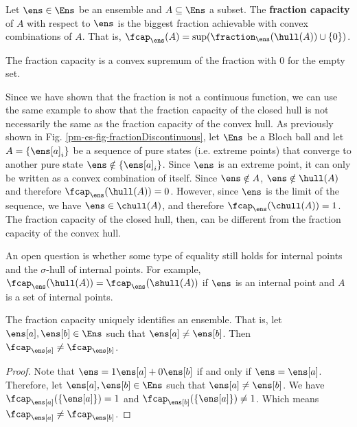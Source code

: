 \begin{mathSection}
	\begin{defn}
		Let $\ens \in \Ens$ be an ensemble and $A \subseteq \Ens$ a subset. The \textbf{fraction capacity} of $A$ with respect to $\ens$ is the biggest fraction achievable with convex combinations of $A$. That is, $\fcap_{\ens}(A) = \sup(\fraction_{\ens}(\hull(A))\cup\{0\})$.
	\end{defn}

	\begin{coro}
		The fraction capacity is a convex supremum of the fraction with $0$ for the empty set.
	\end{coro}
	
	\begin{remark}
		Since we have shown that the fraction is not a continuous function, we can use the same example to show that the fraction capacity of the closed hull is not necessarily the same as the fraction capacity of the convex hull. As previously shown in Fig. \ref{pm-es-fig-fractionDiscontinuous}, let $\Ens$ be a Bloch ball and let $A=\{\ens[a]_i\}$ be a sequence of pure states (i.e. extreme points) that converge to another pure state $\ens \notin \{\ens[a]_i\}$. Since $\ens$ is an extreme point, it can only be written as a convex combination of itself. Since $\ens \notin A$, $\ens \notin \hull(A)$ and therefore $\fcap_{\ens}(\hull(A))=0$. However, since $\ens$ is the limit of the sequence, we have $\ens \in \chull(A)$, and therefore $\fcap_{\ens}(\chull(A)) = 1$. The fraction capacity of the closed hull, then, can be different from the fraction capacity of the convex hull.
		
		An open question is whether some type of equality still holds for internal points and the $\sigma$-hull of internal points. For example, $\fcap_{\ens}(\hull(A)) = \fcap_{\ens}(\shull(A))$ if $\ens$ is an internal point and $A$ is a set of internal points.
	\end{remark}

	\begin{coro}
		The fraction capacity uniquely identifies an ensemble. That is, let $\ens[a], \ens[b] \in \Ens$ such that $\ens[a] \neq \ens[b]$. Then $\fcap_{\ens[a]} \neq \fcap_{\ens[b]}$.
	\end{coro}
	
	\begin{proof}
		Note that $\ens = 1 \ens[a] + 0 \ens[b]$ if and only if $\ens = \ens[a]$. Therefore, let $\ens[a], \ens[b] \in \Ens$ such that $\ens[a] \neq \ens[b]$. We have $\fcap_{\ens[a]}(\{\ens[a]\}) = 1$ and $\fcap_{\ens[b]}(\{\ens[a]\}) \neq 1$. Which means $\fcap_{\ens[a]} \neq \fcap_{\ens[b]}$.
	\end{proof}
	

\end{mathSection}

